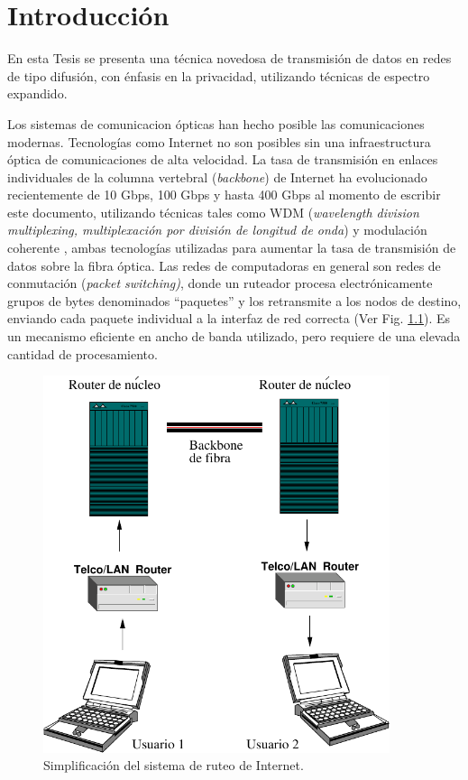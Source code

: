 \chapter{Introducción}

En esta Tesis se presenta una técnica novedosa de transmisión de datos en redes de tipo difusión, con énfasis en la privacidad, utilizando técnicas de espectro expandido.

Los sistemas de comunicacion ópticas han hecho posible las comunicaciones modernas. Tecnologías como Internet no son posibles sin una infraestructura óptica de comunicaciones de alta velocidad. 
La tasa de transmisión en enlaces individuales de la columna vertebral (\textit{backbone}) de Internet ha evolucionado recientemente de 10 Gbps, 100 Gbps y hasta 400 Gbps \cite{backbone} al momento de escribir este documento, utilizando técnicas tales como WDM (\textit{wavelength division multiplexing, multiplexación por división de longitud de onda}) y modulación coherente \cite{shieh2008coherent}, ambas tecnologías utilizadas para aumentar la tasa de transmisión de datos sobre la fibra óptica. 
Las redes de computadoras en general son redes de conmutación (\textit{packet switching)}, donde un ruteador procesa electrónicamente grupos de bytes denominados ``paquetes'' y los retransmite a los nodos de destino, enviando cada paquete individual a la interfaz de red correcta (Ver Fig. \ref{arch:simp}). Es un mecanismo eficiente en ancho de banda utilizado, pero requiere de una elevada cantidad de procesamiento.

\begin{figure}[!t]
  \centering
    \includegraphics[width=4.0in]{graphs/internet.pdf}
    \caption{Simplificación del sistema de ruteo de Internet.}
    \label{arch:simp}
\end{figure}


